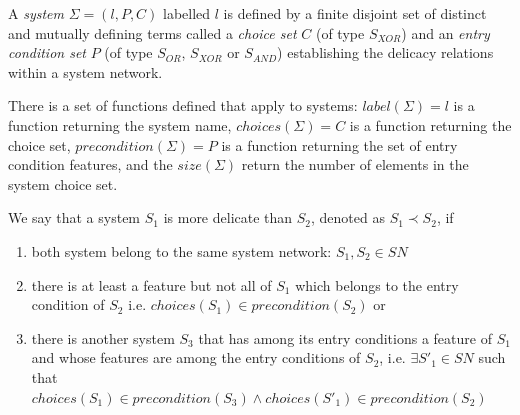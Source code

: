     \begin{definition}[System]\label{def:formal-system}
    A \textit{system} $\Sigma=(l,P,C)$ labelled $l$ is defined by a finite disjoint set of distinct and mutually defining terms called a \textit{choice set} $C$ (of type $S_{XOR}$) and an \textit{entry condition set} $P$ (of type $S_{OR}$, $S_{XOR}$ or $S_{AND}$) establishing the delicacy relations within a system network.
    \end{definition}

    There is a set of functions defined that apply to systems: $label(\Sigma)=l$ is a function returning the system name, $choices(\Sigma)=C$ is a function returning the choice set, $precondition(\Sigma)=P$ is a function returning the set of entry condition features, and the $size(\Sigma)$ return the number of elements in the system choice set.  

    \begin{definition} \label{def:delicacy-hierarchy}
    	We say that a system $S_{1}$ is more delicate than $S_{2}$, denoted as $S_{1} \prec S_{2}$, if 
    	\begin{enumerate}
    		\item both system belong to the same system network: $S_{1}, S_{2} \in SN$ 
    		\item there is at least a feature but not all of $S_{1}$ which belongs to the entry condition of $S_{2}$ i.e. $choices(S_{1}) \in precondition(S_{2})$ or
            \item there is another system $S_{3}$ that has among its entry conditions a feature of $S_1$ and whose features are among the entry conditions of $S_{2}$, i.e. $ \exists S'_{1} \in SN$ such that $ choices(S_{1}) \in precondition(S_{3}) \land choices(S'_{1}) \in precondition(S_{2})$
    	\end{enumerate} 
    \end{definition}

